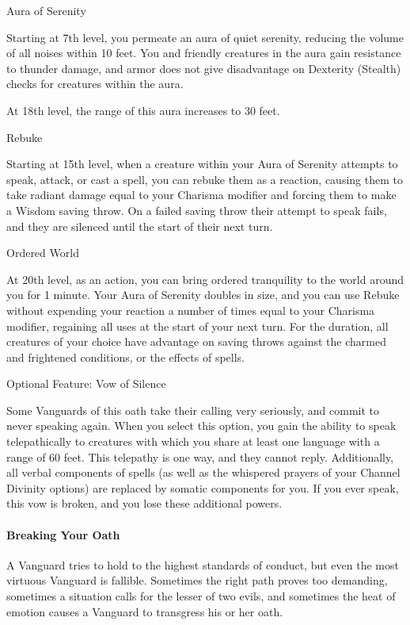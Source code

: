 Aura of Serenity

Starting at 7th level, you permeate an aura of quiet serenity, reducing
the volume of all noises within 10 feet. You and friendly creatures in
the aura gain resistance to thunder damage, and armor does not give
disadvantage on Dexterity (Stealth) checks for creatures within the
aura.

At 18th level, the range of this aura increases to 30 feet.

Rebuke

Starting at 15th level, when a creature within your Aura of Serenity
attempts to speak, attack, or cast a spell, you can rebuke them as a
reaction, causing them to take radiant damage equal to your Charisma
modifier and forcing them to make a Wisdom saving throw. On a failed
saving throw their attempt to speak fails, and they are silenced until
the start of their next turn.

Ordered World

At 20th level, as an action, you can bring ordered tranquility to the
world around you for 1 minute. Your Aura of Serenity doubles in size,
and you can use Rebuke without expending your reaction a number of times
equal to your Charisma modifier, regaining all uses at the start of your
next turn. For the duration, all creatures of your choice have advantage
on saving throws against the charmed and frightened conditions, or the
effects of spells.

Optional Feature: Vow of Silence

Some Vanguards of this oath take their calling very seriously, and
commit to never speaking again. When you select this option, you gain
the ability to speak telepathically to creatures with which you share at
least one language with a range of 60 feet. This telepathy is one way,
and they cannot reply. Additionally, all verbal components of spells (as
well as the whispered prayers of your Channel Divinity options) are
replaced by somatic components for you. If you ever speak, this vow is
broken, and you lose these additional powers.

\paragraph{Breaking Your Oath}\label{_breaking_your_oath}

A Vanguard tries to hold to the highest standards of conduct, but even
the most virtuous Vanguard is fallible. Sometimes the right path proves
too demanding, sometimes a situation calls for the lesser of two evils,
and sometimes the heat of emotion causes a Vanguard to transgress his or
her oath.

